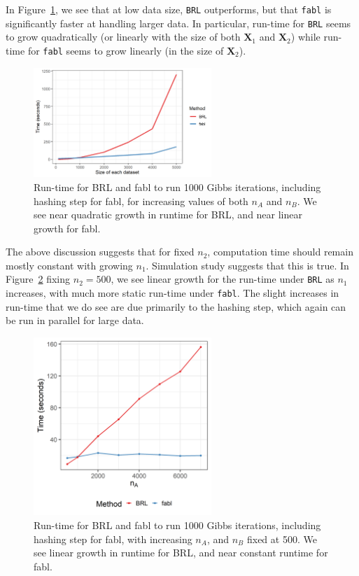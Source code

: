 \documentclass[ba]{imsart}
\begin{document}
In Figure~\ref{fig:speed1}, we see that at low data size, \texttt{BRL} outperforms, but that \texttt{fabl} is significantly faster at handling larger data. In particular, run-time for \texttt{BRL} seems to grow quadratically (or linearly with the size of both $\bm{X}_1$ and $\bm{X}_2$) while run-time for \texttt{fabl} seems to grow linearly (in the size of $\bm{X}_2$).

\begin{figure}[t]
	\begin{center} \includegraphics[width=0.6\textwidth]{../notes/figures/sadinle_speed_plot2} 
		\caption{Run-time for BRL and fabl to run 1000 Gibbs iterations, including hashing step for fabl, for increasing values of both $n_A$ and $n_B$. We see near quadratic growth in runtime for BRL, and near linear growth for fabl.}\label{fig:speed1}
	\end{center}
\end{figure}

The above discussion suggests that for fixed \(n_2\), computation time
should remain mostly constant with growing \(n_1\). Simulation study
suggests that this is true. In Figure~\ref{fig:speed2} fixing \(n_2 = 500\), we
see linear growth for the run-time under \texttt{BRL} as \(n_1\)
increases, with much more static run-time under \texttt{fabl}. The
slight increases in run-time that we do see are due primarily to the
hashing step, which again can be run in parallel for large data.

\begin{figure}[h!]
	\begin{center} \includegraphics[width=0.6\textwidth]{../notes/figures/speed_plot_fixed_nB_slides} 
		\caption{Run-time for BRL and fabl to run 1000 Gibbs iterations, including hashing step for fabl, with increasing $n_A$, and $n_B$ fixed at 500. We see linear growth in runtime for BRL, and near constant runtime for fabl.}\label{fig:speed2}
	\end{center}
\end{figure}
\end{document}
